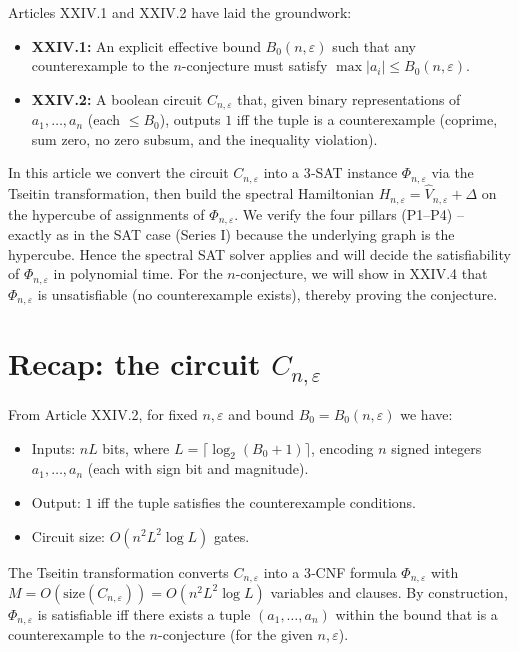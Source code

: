 \documentclass[11pt,a4paper]{article}
\begin{document}
Articles XXIV.1 and XXIV.2 have laid the groundwork:
\begin{itemize}
\item \textbf{XXIV.1:} An explicit effective bound $B_0(n,\varepsilon)$ such that any counterexample to the $n$-conjecture must satisfy $\max|a_i| \le B_0(n,\varepsilon)$.
\item \textbf{XXIV.2:} A boolean circuit $C_{n,\varepsilon}$ that, given binary representations of $a_1,\dots,a_n$ (each $\le B_0$), outputs $1$ iff the tuple is a counterexample (coprime, sum zero, no zero subsum, and the inequality violation).
\end{itemize}
In this article we convert the circuit $C_{n,\varepsilon}$ into a 3‑SAT instance $\Phi_{n,\varepsilon}$ via the Tseitin transformation, then build the spectral Hamiltonian $H_{n,\varepsilon} = \hat{V}_{n,\varepsilon} + \Delta$ on the hypercube of assignments of $\Phi_{n,\varepsilon}$. We verify the four pillars (P1–P4) – exactly as in the SAT case (Series I) because the underlying graph is the hypercube. Hence the spectral SAT solver applies and will decide the satisfiability of $\Phi_{n,\varepsilon}$ in polynomial time. For the $n$-conjecture, we will show in XXIV.4 that $\Phi_{n,\varepsilon}$ is unsatisfiable (no counterexample exists), thereby proving the conjecture.

\section{Recap: the circuit $C_{n,\varepsilon}$}

From Article XXIV.2, for fixed $n,\varepsilon$ and bound $B_0 = B_0(n,\varepsilon)$ we have:
\begin{itemize}
\item Inputs: $nL$ bits, where $L = \lceil \log_2(B_0+1)\rceil$, encoding $n$ signed integers $a_1,\dots,a_n$ (each with sign bit and magnitude).
\item Output: $1$ iff the tuple satisfies the counterexample conditions.
\item Circuit size: $O(n^2 L^2 \log L)$ gates.
\end{itemize}

The Tseitin transformation converts $C_{n,\varepsilon}$ into a 3‑CNF formula $\Phi_{n,\varepsilon}$ with $M = O(\text{size}(C_{n,\varepsilon})) = O(n^2 L^2 \log L)$ variables and clauses. By construction, $\Phi_{n,\varepsilon}$ is satisfiable iff there exists a tuple $(a_1,\dots,a_n)$ within the bound that is a counterexample to the $n$-conjecture (for the given $n,\varepsilon$).
\end{document}
